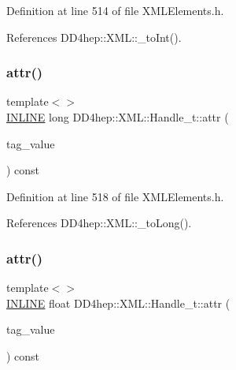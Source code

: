 Definition at line 514 of file X\+M\+L\+Elements.\+h.



References D\+D4hep\+::\+X\+M\+L\+::\+\_\+to\+Int().

\hypertarget{class_d_d4hep_1_1_x_m_l_1_1_handle__t_a26e54c956be05443deda9d8997c08d2e}{}\label{class_d_d4hep_1_1_x_m_l_1_1_handle__t_a26e54c956be05443deda9d8997c08d2e} 
\subsubsection{\texorpdfstring{attr()}{attr()}\hspace{0.1cm}{\footnotesize\ttfamily [8/10]}}
{\footnotesize\ttfamily template$<$$>$ \\
\hyperlink{_x_m_l_elements_8h_a2eb6f9e0395b47b8d5e3eeae4fe0c116}{I\+N\+L\+I\+NE} long D\+D4hep\+::\+X\+M\+L\+::\+Handle\+\_\+t\+::attr (\begin{DoxyParamCaption}\item[{const \hyperlink{namespace_d_d4hep_1_1_x_m_l_a09e5d9cc86ed782f6826dfe0778c1815}{Xml\+Char} $\ast$}]{tag\+\_\+value }\end{DoxyParamCaption}) const}



Definition at line 518 of file X\+M\+L\+Elements.\+h.



References D\+D4hep\+::\+X\+M\+L\+::\+\_\+to\+Long().

\hypertarget{class_d_d4hep_1_1_x_m_l_1_1_handle__t_a6f202b39c57b63cd9caaa3e209129a8f}{}\label{class_d_d4hep_1_1_x_m_l_1_1_handle__t_a6f202b39c57b63cd9caaa3e209129a8f} 
\subsubsection{\texorpdfstring{attr()}{attr()}\hspace{0.1cm}{\footnotesize\ttfamily [9/10]}}
{\footnotesize\ttfamily template$<$$>$ \\
\hyperlink{_x_m_l_elements_8h_a2eb6f9e0395b47b8d5e3eeae4fe0c116}{I\+N\+L\+I\+NE} float D\+D4hep\+::\+X\+M\+L\+::\+Handle\+\_\+t\+::attr (\begin{DoxyParamCaption}\item[{const \hyperlink{namespace_d_d4hep_1_1_x_m_l_a09e5d9cc86ed782f6826dfe0778c1815}{Xml\+Char} $\ast$}]{tag\+\_\+value }\end{DoxyParamCaption}) const}



